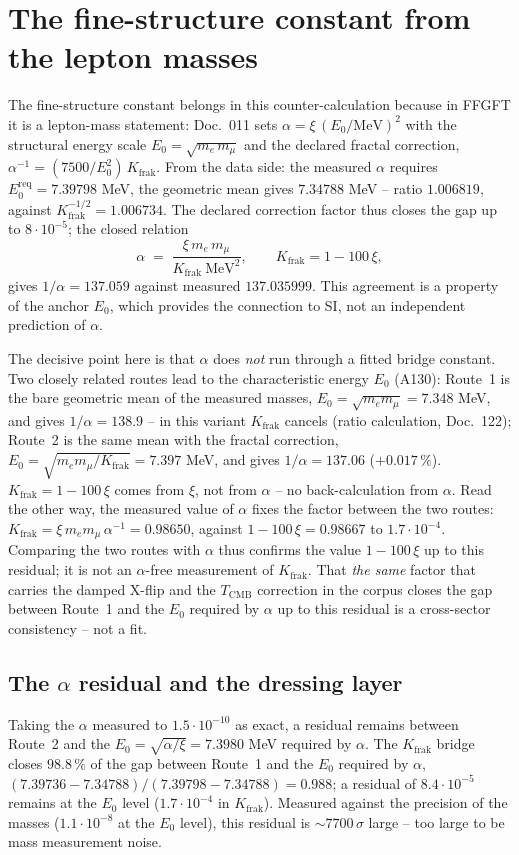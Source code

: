 \section{The fine-structure constant from the lepton masses}
The fine-structure constant belongs in this counter-calculation because in
FFGFT it is a lepton-mass statement: Doc.~011 sets
$\alpha = \xi\,(E_0/\text{MeV})^2$ with the structural energy scale
$E_0=\sqrt{m_e\,m_\mu}$ and the declared fractal correction,
$\alpha^{-1} = (7500/E_0^2)\,K_{\text{frak}}$. From the data side: the
measured $\alpha$ requires $E_0^{\text{req}}=7.39798$ MeV, the geometric
mean gives $7.34788$ MeV -- ratio $1.006819$, against
$K_{\text{frak}}^{-1/2}=1.006734$. The declared correction factor thus
closes the gap up to $8\cdot10^{-5}$; the closed
relation
\begin{equation}
  \alpha \;=\; \frac{\xi\, m_e\, m_\mu}{K_{\text{frak}}\ \text{MeV}^2},
  \qquad K_{\text{frak}}=1-100\,\xi,
\end{equation}
gives $1/\alpha = 137.059$ against measured $137.035999$. This agreement is
a property of the anchor $E_0$, which provides the connection to SI, not an
independent prediction of $\alpha$.

The decisive point here is that $\alpha$ does \emph{not} run through a
fitted bridge constant. Two closely related routes lead to the
characteristic energy $E_0$ (A130): Route~1 is the bare geometric mean of
the measured masses, $E_0=\sqrt{m_e m_\mu}=7.348$ MeV, and gives
$1/\alpha = 138.9$ -- in this variant $K_{\text{frak}}$ cancels (ratio calculation, Doc.~122); Route~2 is the same mean with the fractal correction,
$E_0=\sqrt{m_e m_\mu/K_{\text{frak}}}=7.397$ MeV, and gives
$1/\alpha = 137.06$ ($+0.017\,\%$). $K_{\text{frak}}=1-100\,\xi$ comes from
$\xi$, not from $\alpha$ -- no back-calculation from $\alpha$. Read the other
way, the measured value of $\alpha$ fixes the factor between the two routes:
$K_{\text{frak}} = \xi\,m_e m_\mu\,\alpha^{-1} = 0.98650$, against
$1-100\,\xi = 0.98667$ to $1.7\cdot10^{-4}$. Comparing the two routes with
$\alpha$ thus confirms the value $1-100\,\xi$ up to this residual; it is not
an $\alpha$-free measurement of $K_{\text{frak}}$. That \emph{the same} factor that carries the damped
X-flip and the $T_{\text{CMB}}$ correction in the corpus closes the gap
between Route~1 and the $E_0$ required by $\alpha$ up to this residual is a
cross-sector consistency -- not a fit.

\subsection{The $\alpha$ residual and the dressing layer}
Taking the $\alpha$ measured to $1.5\cdot10^{-10}$ as exact, a residual
remains between Route~2 and the $E_0=\sqrt{\alpha/\xi}=7.3980$ MeV required by
$\alpha$. The $K_{\text{frak}}$ bridge closes $98.8\,\%$ of the gap between
Route~1 and the $E_0$ required by $\alpha$,
$(7.39736-7.34788)/(7.39798-7.34788) = 0.988$; a residual of
$8.4\cdot10^{-5}$ remains at the $E_0$ level ($1.7\cdot10^{-4}$ in
$K_{\text{frak}}$). Measured against the precision of the masses
($1.1\cdot10^{-8}$ at the $E_0$ level), this residual is $\sim7700\,\sigma$
large -- too large to be mass measurement noise.

